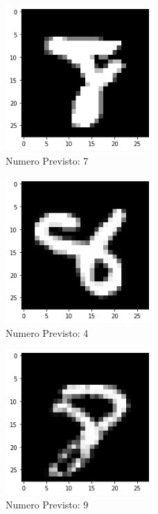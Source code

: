 \documentclass[12pt, a4paper]{article}
\begin{document}
\begin{figure}[H]
    \centering
    \caption{Numero Previsto: 7}
    \includegraphics[width=0.50\textwidth]{otto3.png}
\end{figure} 
\begin{figure}[H]
    \centering
    \caption{Numero Previsto: 4}
    \includegraphics[width=0.50\textwidth]{otto4.png}
\end{figure} 
\begin{figure}[H]
    \centering
    \caption{Numero Previsto: 9}
    \includegraphics[width=0.50\textwidth]{otto5.png}
\end{figure} 
\end{document}
